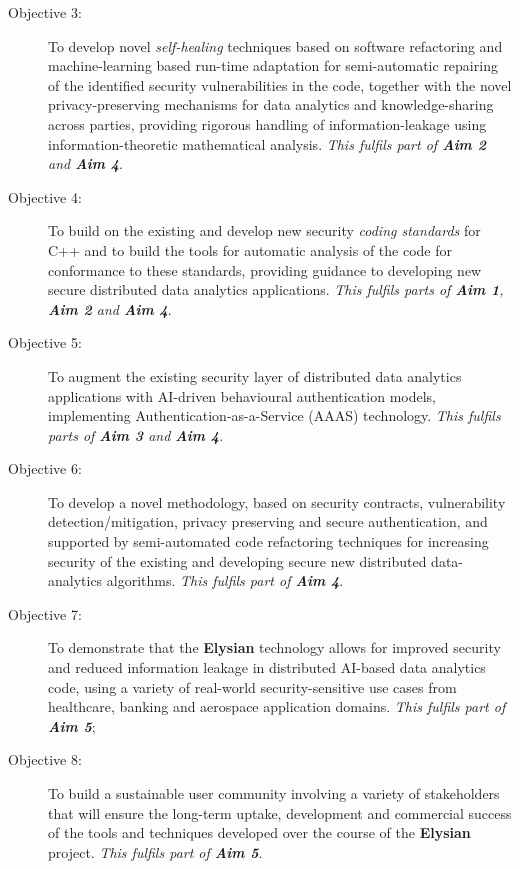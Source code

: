 \documentclass[a4paper,11pt]{article}
\newcommand{\project}[1]{\textbf{#1}\xspace}
\newcommand{\SECURITY}{\project{Elysian}}
\newcommand{\TheProject}{\SECURITY}
\begin{document}
\begin{description}
\item[Objective 3:] To develop novel \emph{self-healing} techniques based on software refactoring and machine-learning based run-time adaptation for semi-automatic repairing of the identified security vulnerabilities in the code, together with the novel privacy-preserving mechanisms for data analytics and knowledge-sharing across parties, providing rigorous handling of information-leakage using information-theoretic mathematical analysis. \emph{This fulfils part of \textbf{Aim 2} and \textbf{Aim 4}}.

\item[Objective 4:] To build on the existing and develop new security \emph{coding standards} for C++ and to build the tools for automatic analysis of the code for conformance to these standards, providing guidance to developing new secure distributed data analytics applications. \emph{This fulfils parts of \textbf{Aim 1}, \textbf{Aim 2} and \textbf{Aim 4}}.

\item[Objective 5:] To augment the existing security layer of distributed data analytics applications with AI-driven behavioural authentication models, implementing Authentication-as-a-Service (AAAS) technology. \emph{This fulfils parts of \textbf{Aim 3} and \textbf{Aim 4}}.

\item[Objective 6:] To develop a novel methodology, based on security contracts, vulnerability detection/mitigation,
  privacy preserving and secure authentication, and supported by semi-automated code refactoring techniques for
  increasing security of the existing and developing secure new distributed data-analytics algorithms. \emph{This fulfils
    part of \textbf{Aim 4}}.

\item[Objective 7:] To demonstrate that the \TheProject{} technology allows for improved security and reduced
  information leakage in distributed AI-based data analytics code, using a variety of real-world security-sensitive
  use cases from healthcare, banking and aerospace application domains. \emph{This fulfils part of \textbf{Aim 5}};

\item[Objective 8:] To build a sustainable user community involving a variety of stakeholders that will ensure the long-term
  uptake, development and commercial success of the tools and techniques developed over the course of the \TheProject{}
  project. \emph{This fulfils part of \textbf{Aim 5}}.

\end{description}
\end{document}
